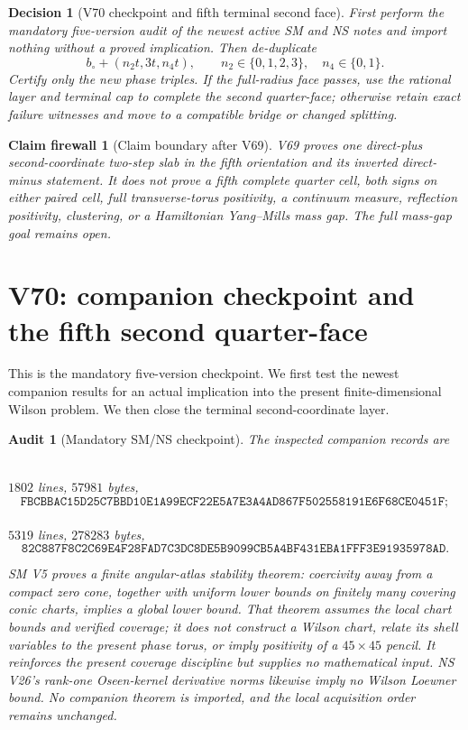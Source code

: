 \documentclass[11pt,oneside]{article}
\newtheorem{firewall}[theorem]{Claim firewall}
\newtheorem{audit}[theorem]{Audit}
\newtheorem{decision}[theorem]{Decision}
\theoremstyle{definition}
\theoremstyle{remark}
\begin{document}
\begin{decision}[V70 checkpoint and fifth terminal second face]
\label{dec:newv69-next}
First perform the mandatory five-version audit of the newest active
SM and NS notes and import nothing without a proved implication.
Then de-duplicate
\[
 b_\circ+(n_2t,3t,n_4t),\qquad
 n_2\in\{0,1,2,3\},\quad n_4\in\{0,1\}.              \tag{69.13}
\]
Certify only the new phase triples.  If the full-radius face passes,
use the rational layer and terminal cap to complete the second
quarter-face; otherwise retain exact failure witnesses and move to
a compatible bridge or changed splitting.
\end{decision}

\begin{firewall}[Claim boundary after V69]
\label{fire:newv69-final}
V69 proves one direct-plus second-coordinate two-step slab in the
fifth orientation and its inverted direct-minus statement.  It
does not prove a fifth complete quarter cell, both signs on either
paired cell, full transverse-torus positivity, a continuum measure,
reflection positivity, clustering, or a Hamiltonian Yang--Mills
mass gap.  The full mass-gap goal remains open.
\end{firewall}

\section{V70: companion checkpoint and the fifth second quarter-face}
\label{sec:newv70-fifth-second-face}

This is the mandatory five-version checkpoint.  We first test the
newest companion results for an actual implication into the present
finite-dimensional Wilson problem.  We then close the terminal
second-coordinate layer.

\begin{audit}[Mandatory SM/NS checkpoint]
\label{audit:newv70-companions}
The inspected companion records are
\begin{center}
\small
{}\\
\(1802\) lines, \(57981\) bytes,
\[
\texttt{FBCBBAC15D25C7BBD10E1A99ECF22E5A7E3A4AD867F502558191E6F68CE0451F};
\]
\\
\(5319\) lines, \(278283\) bytes,
\[
\texttt{82C887F8C2C69E4F28FAD7C3DC8DE5B9099CB5A4BF431EBA1FFF3E91935978AD}.
                                                               \tag{70.1}
\]
\end{center}
SM V5 proves a finite angular-atlas stability theorem: coercivity
away from a compact zero cone, together with uniform lower bounds
on finitely many covering conic charts, implies a global lower
bound.  That theorem assumes the local chart bounds and verified
coverage; it does not construct a Wilson chart, relate its shell
variables to the present phase torus, or imply positivity of a
\(45\times45\) pencil.  It reinforces the present coverage
discipline but supplies no mathematical input.  NS V26's rank-one
Oseen-kernel derivative norms likewise imply no Wilson Loewner
bound.  No companion theorem is imported, and the local acquisition
order remains unchanged.
\end{audit}
\end{document}
